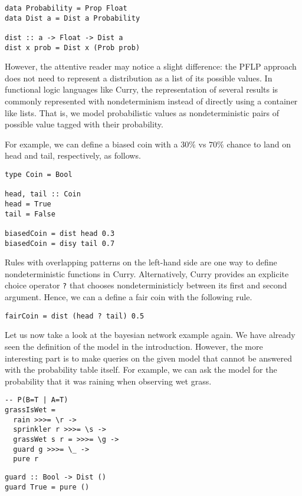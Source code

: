 \documentclass[
12pt, %
a4paper, %
oneside, %
]{llncs}
\newcommand{\code}[1]{{\texttt{#1}}}
\begin{document}
\begin{verbatim}
data Probability = Prop Float
data Dist a = Dist a Probability

dist :: a -> Float -> Dist a
dist x prob = Dist x (Prob prob)
\end{verbatim}

However, the attentive reader may notice a slight difference: the PFLP
approach does not need to represent a distribution as a list of its
possible values. %
In functional logic languages like Curry, the representation of
several results is commonly represented with nondeterminism instead of
directly using a container like lists. %
That is, we model probabilistic values as nondeterministic pairs of
possible value tagged with their probability. %

For example, we can define a biased coin with a $30\%$ vs $70\%$
chance to land on head and tail, respectively, as follows. %

\begin{verbatim}
type Coin = Bool

head, tail :: Coin
head = True
tail = False

biasedCoin = dist head 0.3
biasedCoin = disy tail 0.7
\end{verbatim}

Rules with overlapping patterns on the left-hand side are one way to
define nondeterministic functions in Curry. %
Alternatively, Curry provides an explicite choice operator \code{?}
that chooses nondeterministicly between its first and second
argument. %
Hence, we can a define a fair coin with the following rule. %

\begin{verbatim}
fairCoin = dist (head ? tail) 0.5
\end{verbatim}

Let us now take a look at the bayesian network example again. %
We have already seen the definition of the model in the
introduction. %
However, the more interesting part is to make queries on the given
model that cannot be answered with the probability table itself. %
For example, we can ask the model for the probability that it was
raining when observing wet grass. %

\begin{verbatim}
-- P(B=T | A=T)
grassIsWet =
  rain >>>= \r ->
  sprinkler r >>>= \s ->
  grassWet s r = >>>= \g ->
  guard g >>>= \_ ->
  pure r
\end{verbatim}


\begin{verbatim}
guard :: Bool -> Dist ()
guard True = pure ()
\end{verbatim}
\end{document}
